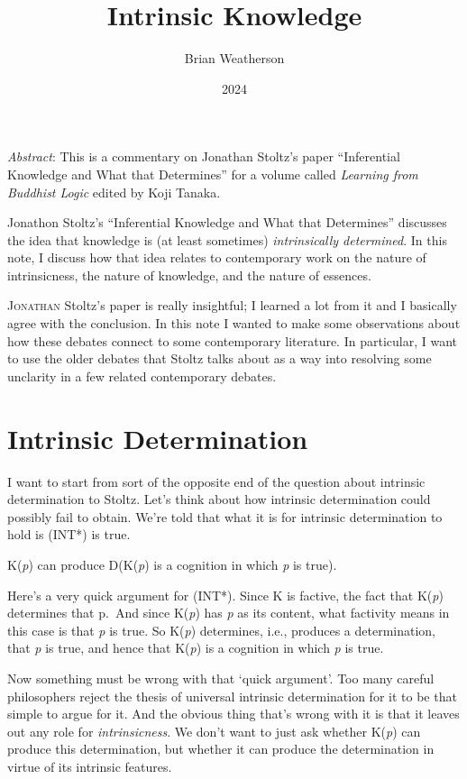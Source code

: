 \documentclass[
  11pt,
  letterpaper,
  DIV=11,
  numbers=noendperiod,
  twoside]{scrartcl}
\title{Intrinsic Knowledge}
\author{Brian Weatherson}
\date{2024}
\providecommand{\tightlist}{%
  \setlength{\itemsep}{0pt}\setlength{\parskip}{0pt}}
\renewenvironment{abstract}
 {\vspace{-1.25cm}
 \quotation\small\noindent\emph{Abstract}:}
 {\endquotation}
\renewenvironment{abstract}
 {\quotation\small\noindent\emph{Abstract}:}
 {\endquotation\vspace{-0.02cm}}
\begin{document}
\maketitle
\begin{abstract}
This is a commentary on Jonathan Stoltz's paper ``Inferential Knowledge
and What that Determines'' for a volume called \emph{Learning from
Buddhist Logic} edited by Koji Tanaka.

Jonathon Stoltz's ``Inferential Knowledge and What that Determines''
discusses the idea that knowledge is (at least sometimes)
\emph{intrinsically determined}. In this note, I discuss how that idea
relates to contemporary work on the nature of intrinsicness, the nature
of knowledge, and the nature of essences.
\end{abstract}


\lettrine{J}{onathan} Stoltz's paper is really insightful; I learned a
lot from it and I basically agree with the conclusion. In this note I
wanted to make some observations about how these debates connect to some
contemporary literature. In particular, I want to use the older debates
that Stoltz talks about as a way into resolving some unclarity in a few
related contemporary debates.

\section{Intrinsic Determination}\label{sec-intrinsic-determination}

I want to start from sort of the opposite end of the question about
intrinsic determination to Stoltz. Let's think about how intrinsic
determination could possibly fail to obtain. We're told that what it is
for intrinsic determination to hold is (INT*) is true.

\begin{description}
\tightlist
\item[(INT*)]
K(\emph{p}) can produce D(K(\emph{p}) is a cognition in which \emph{p}
is true).
\end{description}

Here's a very quick argument for (INT*). Since K is factive, the fact
that K(\emph{p}) determines that p.~And since K(\emph{p}) has \emph{p}
as its content, what factivity means in this case is that \emph{p} is
true. So K(\emph{p}) determines, i.e., produces a determination, that
\emph{p} is true, and hence that K(\emph{p}) is a cognition in which
\emph{p} is true.

Now something must be wrong with that `quick argument'. Too many careful
philosophers reject the thesis of universal intrinsic determination for
it to be that simple to argue for it. And the obvious thing that's wrong
with it is that it leaves out any role for \emph{intrinsicness}. We
don't want to just ask whether K(\emph{p}) can produce this
determination, but whether it can produce the determination in virtue of
its intrinsic features.
\end{document}

